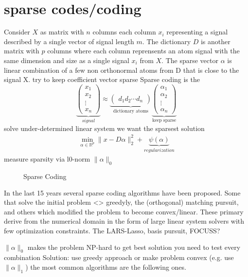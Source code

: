 \section{sparse codes/coding}
Consider $X$ as matrix with $n$ columns each column $x_{i}$ representing a signal described by a single vector of signal length $m$.
The dictionary $D$ is another matrix with $p$ columns where each column reprensents an atom signal with the same dimension and size as a single signal $x_{i}$ from $X$.
The sparse vector $\alpha$ is linear combination of a few non orthonormal atoms from D that is close to the signal X.
try to keep coefficient vector sparse
Sparse coding is the 
\[
\underbrace{\begin{pmatrix} x_1 \\ x_2 \\ \vdots \\ x_n \end{pmatrix}}_{signal} \approx \underbrace{\begin{pmatrix} d_1  d_2 \cdots d_n \end{pmatrix}}_{\textrm{dictionary atoms}}
\underbrace{\begin{pmatrix} \alpha_1 \\ \alpha_2 \\ \vdots \\ \alpha_n \end{pmatrix}}_{\textrm{keep sparse}}
\]
solve under-determined linear system
we want the sparsest solution
\begin{align}
\min_{\alpha\in\mathbb{R}^{p}}  \lVert x - D\alpha \rVert^{2}_{2} + \underbrace{\psi(\alpha)}_{regularization}
\end{align}
measure sparsity via       l0-norm       $\lVert\alpha\rVert_{0}$

\begin{figure}
\centering
\caption{Sparse Coding}
\label{fig:da_x}
\end{figure}


In the last 15 years several sparse coding algorithms have been proposed. 
Some that solve the initial problem <> greedyly, the (orthogonal) matching pursuit, and others which modified the problem to become convex/linear. These primary derive from the numerical domain in the form of 
large linear system solvers with few optimization constraints. The LARS-Lasso, basis pursuit, FOCUSS?


$\lVert\alpha\rVert_{0}$ makes the problem NP-hard
to get best solution you need to test every combination
Solution:
use greedy approach or make problem convex (e.g. use $\lVert\alpha\rVert_{1}$)
the most common algorithms are the following ones.


